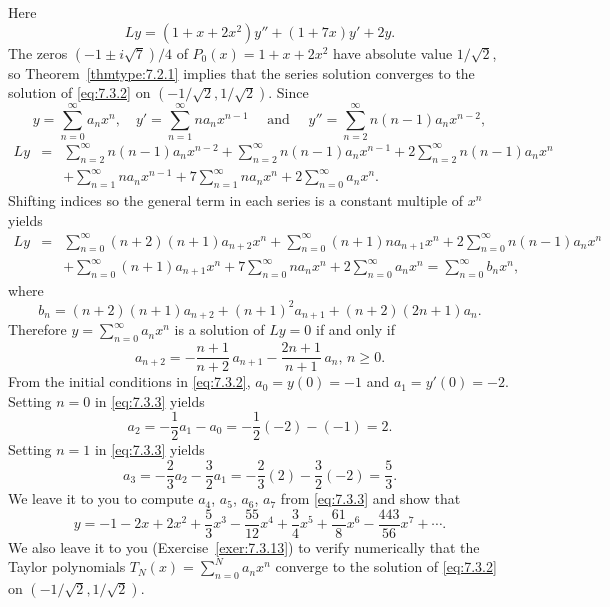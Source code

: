 \begin{examplesolution}
\solution Here
\[
  Ly=(1+x+2x^{2})y''+(1+7x)y'+2y.
\]
The zeros $(-1\pm i\sqrt{7})/4$ of $P_{0}(x)=1+x+2x^{2}$ have absolute value $1/\sqrt{2}$, so
Theorem~\ref{thmtype:7.2.1} implies that the series solution converges to the solution of
\eqref{eq:7.3.2} on $(-1/\sqrt{2},1/\sqrt{2})$. Since
\[
  y=\sum^{\infty}_{n=0}a_{n}x^{n},\quad y'=\sum^{\infty}_{n=1}n a_{n}x^{n-1}\quad\mbox{ and }\quad y''=\sum^{\infty}_{n=2}n(n-1)a_{n}x^{n-2},
\]
\begin{eqnarray*}
  Ly & = & \sum^{\infty}_{n=2}n(n-1)a_{n}x^{n-2}+\sum^{\infty}_{n=2}n(n-1)a_{n}x^{n-1}+2\sum^{\infty}_{n=2}n(n-1)a_{n}x^{n} \\[10pt]
     &   & +\sum^{\infty}_{n=1}na_{n}x^{n-1}+7\sum^{\infty}_{n=1}na_{n}x^{n}+2\sum^{\infty}_{n=0}a_{n}x^{n}.
\end{eqnarray*}
Shifting indices so the general term in each series is a constant multiple of $x^{n}$ yields
\begin{eqnarray*}
  Ly & = & \sum^{\infty}_{n=0}(n+2)(n+1)a_{n+2}x^{n}+\sum^{\infty}_{n=0}(n+1)na_{n+1}x^{n}+2\sum^{\infty}_{n=0}n(n-1)a_{n}x^{n} \\[10pt]
     &   & +\sum^{\infty}_{n=0}(n+1)a_{n+1}x^{n}+7\sum^{\infty}_{n=0}na_{n}x^{n}+2\sum^{\infty}_{n=0}a_{n}x^{n}=\sum^{\infty}_{n=0}b_{n}x^{n},
\end{eqnarray*}
where
\[
  b_{n}=(n+2)(n+1)a_{n+2}+(n+1)^{2}a_{n+1}+(n+2)(2n+1)a_{n}.
\]
Therefore $y=\sum^{\infty}_{n=0}a_{n}x^{n}$ is a solution of $Ly=0$ if and only if
\begin{equation}
  \label{eq:7.3.3}a_{n+2}=-\frac{n+1}{n+2}\,a_{n+1}-\frac{2n+1}{n+1}\,a_{n},\,n\ge0.
\end{equation}
From the initial conditions in \eqref{eq:7.3.2}, $a_{0}=y(0)=-1$ and $a_{1}=y'(0)=-2$. Setting $n=0$
in \eqref{eq:7.3.3} yields
\[
  a_{2}=-\frac{1}{2}a_{1}-a_{0}=-\frac{1}{2}(-2)-(-1)=2.
\]
Setting $n=1$ in \eqref{eq:7.3.3} yields
\[
  a_{3}=-\frac{2}{3}a_{2}-\frac{3}{2}a_{1}=-\frac{2}{3}(2)-\frac{3}{2}(-2)=\frac{5}{3}.
\]
We leave it to you to compute $a_{4}$, $a_{5}$, $a_{6}$, $a_{7}$ from \eqref{eq:7.3.3} and show that
\[
  y=-1-2x+2x^{2}+\frac{5}{3}x^{3}-\frac{55}{12}x^{4}+\frac{3}{4}x^{5}+\frac{61}{8}x^{6}- \frac{443}{56}x^{7}+\cdots.
\]
We also leave it to you (Exercise~\ref{exer:7.3.13}) to verify numerically that the Taylor
polynomials $T_{N}(x)=\sum_{n=0}^{N}a_{n}x^{n}$ converge to the solution of \eqref{eq:7.3.2} on
$(-1/\sqrt{2},1/\sqrt{2})$.
\end{examplesolution}

